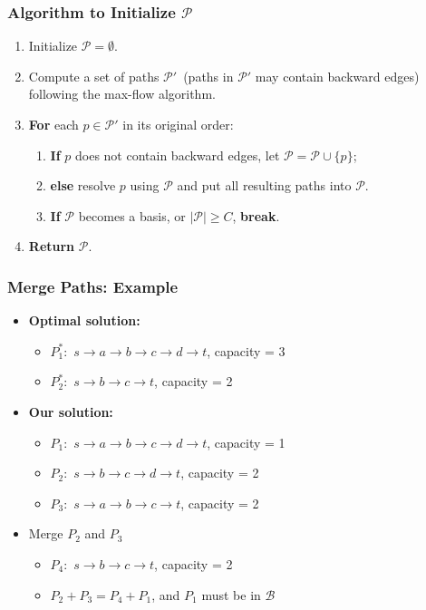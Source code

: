 \frame
{
	\frametitle{Algorithm to Initialize $\mathcal{P}$}

	\begin{enumerate}
	\item Initialize $\mathcal{P} = \emptyset$.
	\vspace{0.2cm}
	\item Compute a set of paths $\mathcal{P}'$~(paths in $\mathcal{P}'$ may contain backward edges) following the max-flow algorithm.
	\vspace{0.2cm}
	\item {\bf For} each $p\in\mathcal{P}'$ in its original order:
		\begin{enumerate}
		\vspace{0.1cm}
		\item {\bf If} $p$ does not contain backward edges, let $\mathcal{P} = \mathcal{P}\cup\{p\}$;
		\vspace{0.1cm}
		\item {\bf else} resolve $p$ using $\mathcal{P}$ and put all resulting paths into $\mathcal{P}$.
		\vspace{0.1cm}
		\item {\bf If} $\mathcal{P}$ becomes a basis, or $|\mathcal{P}| \ge C$, {\bf break}.
		\end{enumerate}
	\vspace{0.2cm}
	\item {\bf Return} $\mathcal{P}$.
	\end{enumerate}
}



\frame
{
	\frametitle{Merge Paths: Example}
	\vspace{0.8cm}
	
	\vspace{0.5cm}
	\begin{itemize}
	\item {\bf Optimal solution:} 
		\begin{itemize}
		\item $P_1^*:$ $s\to a\to b\to c\to d\to t$, capacity = 3
		\item $P_2^*:$  $s\to b\to c\to t$, capacity = 2
		\end{itemize}
	\vspace{0.2cm}
	\item {\bf Our solution:} 
		\begin{itemize}
		\item $P_1:$ $s\to a\to b\to c\to d\to t$, capacity = 1
		\item $P_2:$  $s\to b\to c\to d\to t$, capacity = 2
		\item $P_3:$  $s\to a\to b\to c\to t$, capacity = 2
		\end{itemize}
	\vspace{0.2cm}
	\item Merge $P_2$ and $P_3$ 
		\begin{itemize}
		\item $P_4:$ $s\to b\to c\to t$, capacity = 2
		\item $P_2 + P_3 = P_4 + P_1$, and $P_1$ must be in $\mathcal{B}$
		\end{itemize}
	\end{itemize}

}
